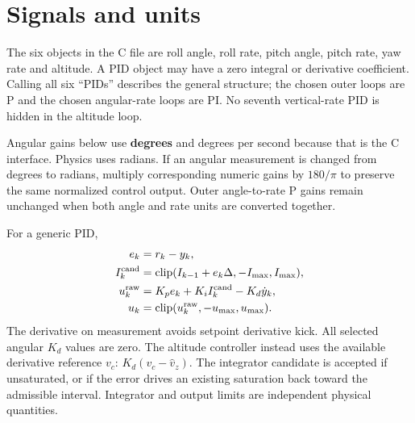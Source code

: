 \section{Signals and units}
The six objects in the C file are roll angle, roll rate, pitch angle, pitch
rate, yaw rate and altitude. A PID object may have a zero integral or
derivative coefficient. Calling all six ``PIDs'' describes the general
structure; the chosen outer loops are P and the chosen angular-rate loops
are PI. No seventh vertical-rate PID is hidden in the altitude loop.

Angular gains below use \textbf{degrees} and degrees per second because that
is the C interface. Physics uses radians. If an angular measurement is
changed from degrees to radians, multiply corresponding numeric gains by
$180/\pi$ to preserve the same normalized control output. Outer angle-to-rate
P gains remain unchanged when both angle and rate units are converted together.

For a generic PID,
\begin{align}
e_k&=r_k-y_k,\\
I_k^{\rm cand}&=\operatorname{clip}(I_{k-1}+e_k\Delta,-I_{\max},I_{\max}),\\
u_k^{\rm raw}&=K_pe_k+K_i I_k^{\rm cand}-K_d\dot y_k,\\
u_k&=\operatorname{clip}(u_k^{\rm raw},-u_{\max},u_{\max}).
\end{align}
The derivative on measurement avoids setpoint derivative kick. All selected
angular $K_d$ values are zero. The altitude controller instead uses the
available derivative reference $v_c$: $K_d(v_c-\hat v_z)$.
The integrator candidate is accepted if unsaturated, or if the error drives
an existing saturation back toward the admissible interval. Integrator and
output limits are independent physical quantities.

